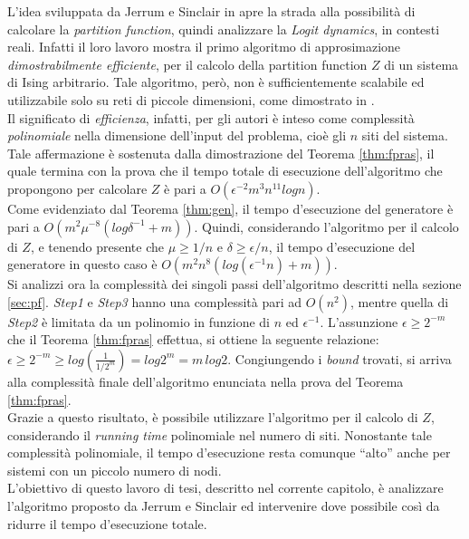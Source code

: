 L'idea sviluppata da Jerrum e Sinclair in \cite{jerrum1993polynomial} apre la strada alla possibilità di calcolare la \textit{partition function}, quindi analizzare la \textit{Logit dynamics}, in contesti reali. Infatti il loro lavoro mostra il primo algoritmo di approsimazione \textit{dimostrabilmente efficiente}, per il calcolo della partition function $Z$ di un sistema di Ising arbitrario. Tale algoritmo, però, non è sufficientemente scalabile ed utilizzabile solo su reti di piccole dimensioni, come dimostrato in \cite{rinaldi2016approximation}.\\
Il significato di \textit{efficienza}, infatti, per gli autori è inteso come complessità \textit{polinomiale} nella dimensione dell'input del problema, cioè gli $n$ siti del sistema.\\
Tale affermazione è sostenuta dalla dimostrazione del Teorema \ref{thm:fpras}, il quale termina con la prova che il tempo totale di esecuzione dell'algoritmo che propongono per calcolare $Z$ è pari a $O(\epsilon^{-2}m^3n^{11}log n)$.\\
Come evidenziato dal Teorema \ref{thm:gen}, il tempo d'esecuzione del generatore è pari a $O(m^2\mu^{-8}(log\delta^{-1} + m))$. Quindi, considerando l'algoritmo per il calcolo di $Z$, e tenendo presente che $\mu \geq 1/n$ e $\delta \geq \epsilon/n$, il tempo d'esecuzione del generatore in questo caso è $O(m^2n^8(log(\epsilon^{-1}n) + m))$.\\
Si analizzi ora la complessità dei singoli passi dell'algoritmo descritti nella sezione \ref{sec:pf}. \textit{Step1} e \textit{Step3} hanno una complessità pari ad $O(n^2)$, mentre quella di \textit{Step2} è limitata da un polinomio in funzione di $n$ ed $\epsilon^{-1}$. L'assunzione $\epsilon \geq 2^{-m}$ che il Teorema \ref{thm:fpras} effettua, si ottiene la seguente relazione: $\epsilon \geq 2^{-m} \geq log\left(\frac{1}{1/2^m}\right) = log 2^m = m\,log2$. Congiungendo i \textit{bound} trovati, si arriva alla complessità finale dell'algoritmo enunciata nella prova del Teorema \ref{thm:fpras}.\\
Grazie a questo risultato, è possibile utilizzare l'algoritmo per il calcolo di $Z$, considerando il \textit{running time} polinomiale nel numero di siti. Nonostante tale complessità polinomiale, il tempo d'esecuzione resta comunque ``alto'' anche per sistemi con un piccolo numero di nodi.\\
L'obiettivo di questo lavoro di tesi, descritto nel corrente capitolo, è analizzare l'algoritmo proposto da Jerrum e Sinclair ed intervenire dove possibile così da ridurre il tempo d'esecuzione totale.
